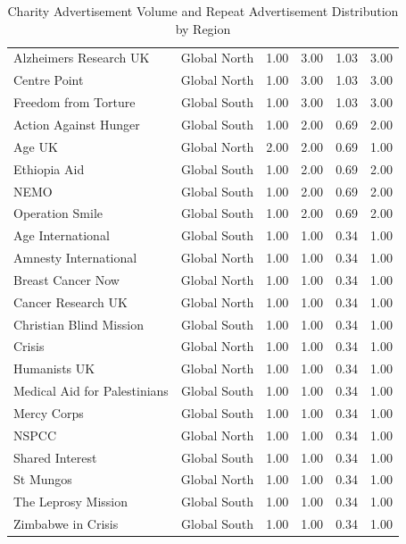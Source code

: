\begin{table}[ht]
\begin{tabular}{p{5cm}ccccc}
  Alzheimers Research UK & Global North & 1.00 & 3.00 & 1.03 & 3.00 \\ 
  Centre Point & Global North & 1.00 & 3.00 & 1.03 & 3.00 \\ 
  Freedom from Torture & Global South & 1.00 & 3.00 & 1.03 & 3.00 \\ 
  Action Against Hunger & Global South & 1.00 & 2.00 & 0.69 & 2.00 \\ 
  Age UK & Global North & 2.00 & 2.00 & 0.69 & 1.00 \\ 
  Ethiopia Aid & Global South & 1.00 & 2.00 & 0.69 & 2.00 \\ 
  NEMO & Global South & 1.00 & 2.00 & 0.69 & 2.00 \\ 
  Operation Smile & Global South & 1.00 & 2.00 & 0.69 & 2.00 \\ 
  Age International & Global South & 1.00 & 1.00 & 0.34 & 1.00 \\ 
  Amnesty International & Global North & 1.00 & 1.00 & 0.34 & 1.00 \\ 
  Breast Cancer Now & Global North & 1.00 & 1.00 & 0.34 & 1.00 \\ 
  Cancer Research UK & Global North & 1.00 & 1.00 & 0.34 & 1.00 \\ 
  Christian Blind Mission & Global South & 1.00 & 1.00 & 0.34 & 1.00 \\ 
  Crisis & Global North & 1.00 & 1.00 & 0.34 & 1.00 \\ 
  Humanists UK & Global North & 1.00 & 1.00 & 0.34 & 1.00 \\ 
  Medical Aid for Palestinians & Global South & 1.00 & 1.00 & 0.34 & 1.00 \\ 
  Mercy Corps & Global South & 1.00 & 1.00 & 0.34 & 1.00 \\ 
  NSPCC & Global North & 1.00 & 1.00 & 0.34 & 1.00 \\ 
  Shared Interest & Global South & 1.00 & 1.00 & 0.34 & 1.00 \\ 
  St Mungos & Global North & 1.00 & 1.00 & 0.34 & 1.00 \\ 
  The Leprosy Mission & Global South & 1.00 & 1.00 & 0.34 & 1.00 \\ 
  Zimbabwe in Crisis & Global South & 1.00 & 1.00 & 0.34 & 1.00 \\ 
   \hline
\end{tabular}
\caption{Charity Advertisement Volume and Repeat Advertisement Distribution by Region} 
\end{table}
